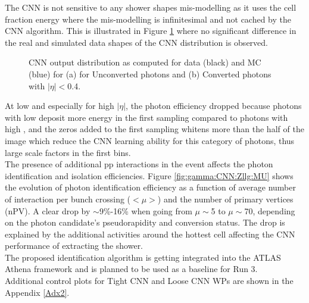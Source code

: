 The CNN is not sensitive to any shower shapes mis-modelling as it uses the cell fraction energy where the mis-modelling is infinitesimal and not cached by the CNN algorithm. This is illustrated in Figure \ref{fig:gamma:CNN:Zllg:CNNOutput} where no significant difference in the real and simulated data shapes of the CNN distribution is observed.
\begin{figure}[htbp]
    \caption{CNN output distribution as computed for data (black) and MC (blue) for (a) for Unconverted photons and (b) Converted photons with $|\eta|<$0.4.}
    \label{fig:gamma:CNN:Zllg:CNNOutput}
\end{figure}

At low \eT and especially for high $|\eta|$, the photon efficiency dropped because photons with low \eT deposit more energy in the first sampling compared to photons with high \eT, and the zeros added to the first sampling whitens more than the half of the image which reduce the CNN learning ability for this category of photons, thus large scale factors in the first \eT bins. \\
The presence of additional pp interactions in the event affects the photon identification and isolation efficiencies. Figure \ref{fig:gamma:CNN:Zllg:MU} shows the evolution of photon identification efficiency as a function of average number of interaction per bunch crossing ($<\mu>$) and the number of primary vertices (nPV). A clear drop by $\sim$9\%-16\% when going from $\mu\sim$5 to $\mu\sim$70, depending on the photon candidate's pseudorapidity and conversion status. The drop is explained by the additional activities around the hottest cell affecting the CNN performance of extracting the shower. \\
The proposed identification algorithm is getting integrated into the ATLAS Athena framework and is planned to be used as a baseline for Run 3. \\
Additional control plots for Tight CNN and Loose CNN WPs are shown in the Appendix \ref{Adx2}.

